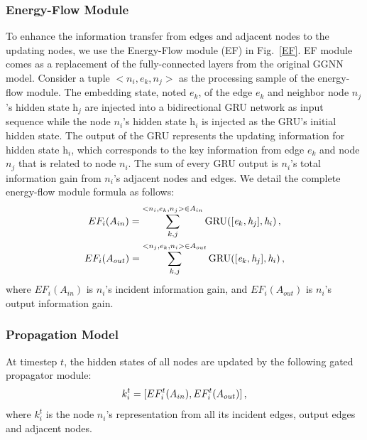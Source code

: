 \documentclass[letterpaper]{article} %
\begin{document}
\subsubsection{Energy-Flow Module}
To enhance the information transfer from edges and adjacent nodes to the updating nodes, we use the Energy-Flow module (EF) in Fig.~\ref{EF}.
EF module comes as a replacement of the fully-connected layers from the original GGNN model. 
Consider a tuple $<{n}_i, {e}_k, {n}_j>$ as the processing sample of the energy-flow module. 
The embedding state, noted $\textit{e}_k$, of the edge ${e}_k$ and neighbor node ${n}_j$'s hidden state $\textit{h}_j$ are injected into a bidirectional GRU network as input sequence while the node ${n}_i$'s hidden state $\textit{h}_i$ is injected as the GRU's initial hidden state. 
The output of the GRU represents the updating information for hidden state $\textit{h}_i$, which corresponds to the key information from edge ${e}_k$ and node ${n}_j$ that is related to node ${n}_i$. 
The sum of every GRU output is ${n}_i$'s total information gain from ${n}_i$'s adjacent nodes and edges. 
We detail the complete energy-flow module formula as follows:
\begin{gather}\notag
    EF_i(A_{in}) = \sum\limits_{k,j}^{<n_i,e_k,n_j>\in A_{in}} \text{GRU}([\textit{e}_k, \textit{h}_j], \textit{h}_i) \, , \\ \notag
    EF_i(A_{out}) = \sum\limits_{k,j}^{<{n}_j,{e}_k,{n}_i>\in A_{out}} \text{GRU}([\textit{e}_k, \textit{h}_j], \textit{h}_i) \, ,\notag
\end{gather}
where $EF_i(A_{in})$ is ${n}_i$'s incident information gain, and $EF_i(A_{out})$ is ${n}_i$'s output information gain.



\subsubsection{Propagation Model}

At timestep $t$, the hidden states of all nodes are updated by the following gated propagator module:
\begin{gather}\notag
    k_{i}^t = [EF_i^t(A_{in}), EF_i^t(A_{out})] \, ,
\end{gather}
where $k_{i}^t$ is the node ${n}_i$'s representation from all its incident edges, output edges and adjacent nodes.
\end{document}
